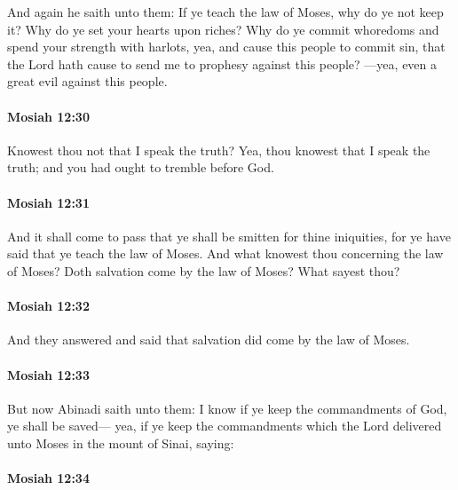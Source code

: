 			And again he saith unto them:
			If ye teach the law of Moses,
			why do ye not keep it?
			Why do ye set your hearts upon riches?
			Why do ye commit whoredoms and spend your strength with harlots,
			yea, and cause this people to commit sin,
			that the Lord hath cause to send me to prophesy against this people?
			---yea, even a great evil against this people.

		\paragraph{Mosiah 12:30} %
			\label{MOSIAH-12-30}

			Knowest thou not that I speak the truth?
			Yea, thou knowest that I speak the truth;
			and you had ought to tremble before God.

		\paragraph{Mosiah 12:31} %
			\label{MOSIAH-12-31}

			And it shall come to pass that ye shall be smitten for thine iniquities,
			for ye have said that ye teach the law of Moses.
			And what knowest thou concerning the law of Moses?
			Doth salvation come by the law of Moses?
			What sayest thou?


		\paragraph{Mosiah 12:32} %
			\label{MOSIAH-12-32}

			And they answered and said
			that salvation did come by the law of Moses.

		\paragraph{Mosiah 12:33} %
			\label{MOSIAH-12-33}

			But now Abinadi saith unto them:
			I know if ye keep the commandments of God, ye shall be saved---
			yea, if ye keep the commandments
			which the Lord delivered unto Moses in the mount of Sinai, saying:

		\paragraph{Mosiah 12:34} %
			\label{MOSIAH-12-34}

